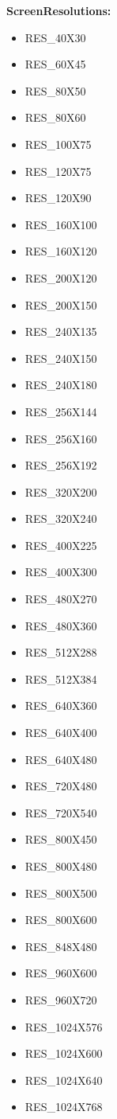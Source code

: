\textbf{ScreenResolutions:}
\begin{itemize}
    \item RES\_40X30
    \item RES\_60X45
    \item RES\_80X50
    \item RES\_80X60
    \item RES\_100X75
    \item RES\_120X75
    \item RES\_120X90
    \item RES\_160X100
    \item RES\_160X120
    \item RES\_200X120
    \item RES\_200X150
    \item RES\_240X135
    \item RES\_240X150
    \item RES\_240X180
    \item RES\_256X144
    \item RES\_256X160
    \item RES\_256X192
    \item RES\_320X200
    \item RES\_320X240
    \item RES\_400X225
    \item RES\_400X300
    \item RES\_480X270
    \item RES\_480X360
    \item RES\_512X288
    \item RES\_512X384
    \item RES\_640X360
    \item RES\_640X400
    \item RES\_640X480
    \item RES\_720X480
    \item RES\_720X540
    \item RES\_800X450
    \item RES\_800X480
    \item RES\_800X500
    \item RES\_800X600
    \item RES\_848X480
    \item RES\_960X600
    \item RES\_960X720
    \item RES\_1024X576
    \item RES\_1024X600
    \item RES\_1024X640
    \item RES\_1024X768

\end{itemize}
